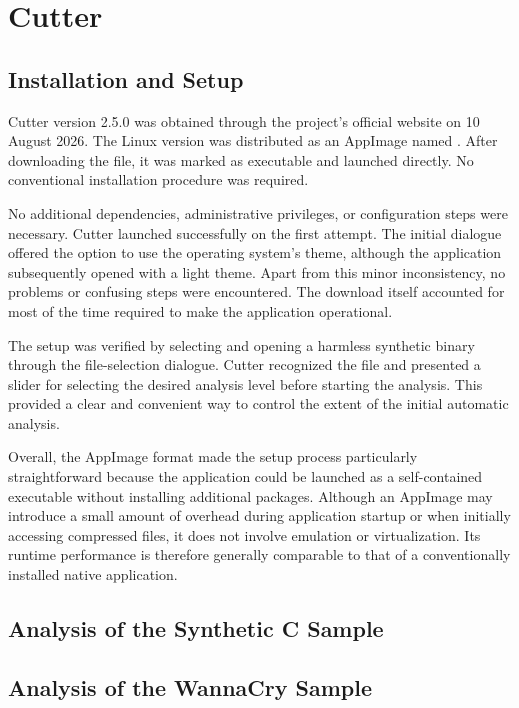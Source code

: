 \section{Cutter}
\label{sec:analysis:cutter}

\subsection{Installation and Setup}
\label{subsec:analysis:cutter:setup}
Cutter version 2.5.0 was obtained through the project's official website on 10 August 2026. The Linux version was distributed as an AppImage named 
. After downloading the file, it was marked as executable and launched directly. No conventional installation procedure 
was required.

No additional dependencies, administrative privileges, or configuration steps were necessary. Cutter launched successfully on the first attempt. The initial 
dialogue offered the option to use the operating system's theme, although the application subsequently opened with a light theme. Apart from this minor 
inconsistency, no problems or confusing steps were encountered. The download itself accounted for most of the time required to make the application operational.

The setup was verified by selecting and opening a harmless synthetic binary through the file-selection dialogue. Cutter recognized the file and presented a slider 
for selecting the desired analysis level before starting the analysis. This provided a clear and convenient way to control the extent of the initial 
automatic analysis.

Overall, the AppImage format made the setup process particularly straightforward because the application could be launched as a self-contained executable 
without installing additional packages. Although an AppImage may introduce a small amount of overhead during application startup or when initially 
accessing compressed files, it does not involve emulation or virtualization. Its runtime performance is therefore generally comparable to that of a 
conventionally installed native application.

\subsection{Analysis of the Synthetic C Sample}
\label{subsec:analysis:cutter:synthetic}

\subsection{Analysis of the WannaCry Sample}
\label{subsec:analysis:cutter:wannacry}


